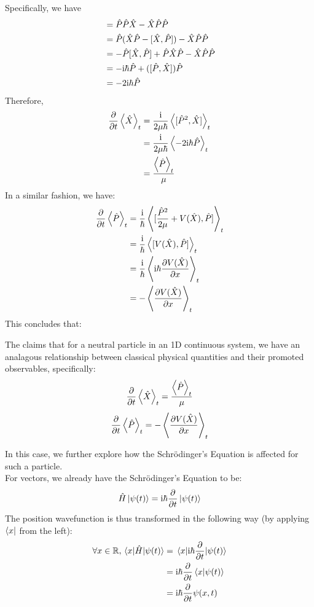 Specifically, we have
\begin{align*}
    [\opmtm^2, \oppos] &= \opmtm\opmtm\oppos - \oppos\opmtm\opmtm \\
    &= \opmtm(\oppos\opmtm - [\oppos, \opmtm]) - \oppos\opmtm\opmtm \\
    &= -\opmtm[\oppos, \opmtm] + \opmtm\oppos\opmtm - \oppos\opmtm\opmtm \\
    &= -\imag \hbar \opmtm + ([\opmtm, \oppos])\opmtm \\
    &= -2\imag\hbar\opmtm
\end{align*}
Therefore,
\begin{align*}
    \pdv{t}\expval{\hat{X}}_t &= \frac{\mathrm{i}}{2\mu \hbar} \expval{[\hat{P}^2, \hat{X}]}_t \\
    &= \frac{\mathrm{i}}{2\mu \hbar} \expval{-2\mathrm{i}\hbar\hat{P}}_t \\
    &= \frac{\expval{\hat{P}}_t}{\mu}
\end{align*}
In a similar fashion, we have:
\begin{align*}
    \pdv{t}\expval{\hat{P}}_t &= \frac{\mathrm{i}}{\hbar} \expval{[\frac{\hat{P}^2}{2\mu} + V(\hat{X}), \hat{P}]}_t \\
    &= \frac{\mathrm{i}}{\hbar} \expval{[V(\hat{X}), \hat{P}]}_t \\
    &= \frac{\mathrm{i}}{\hbar} \expval{\mathrm{i}\hbar \pdv{V(\hat{X})}{x}}_t \\
    &= -\expval{\pdv{V(\hat{X})}{x}}_t
\end{align*}
This concludes that:
\begin{theorem}
    The  claims that for a neutral particle in an 1D continuous system, we have an analagous relationship between classical physical quantities and their promoted observables, specifically:
    $$\pdv{t}\expval{\hat{X}}_t = \frac{\expval{\hat{P}}_t}{\mu}$$
    $$ \pdv{t}\expval{\hat{P}}_t =  -\expval{\pdv{V(\hat{X})}{x}}_t$$
\end{theorem}
In this case, we further explore how the Schr\"odinger's Equation is affected for such a particle. \\
For vectors, we already have the Schr\"odinger's Equation to be:
$$\hat{H} \ket{\psi(t)} = \mathrm{i} \hbar \pdv{t}\ket{\psi(t)}$$
The position wavefunction is thus transformed in the following way (by applying $\bra{x}$ from the left):
\begin{align*}
    \forall x \in \mathbb{R}, \mel{x}{\hat{H}}{\psi(t)} &= \mel{x}{\mathrm{i}\hbar \pdv{t}}{\psi(t)} \\
    &= \mathrm{i}\hbar \pdv{t}\braket{x}{\psi(t)} \\
    &= \mathrm{i} \hbar \pdv{t}\psi(x, t)
\end{align*}

